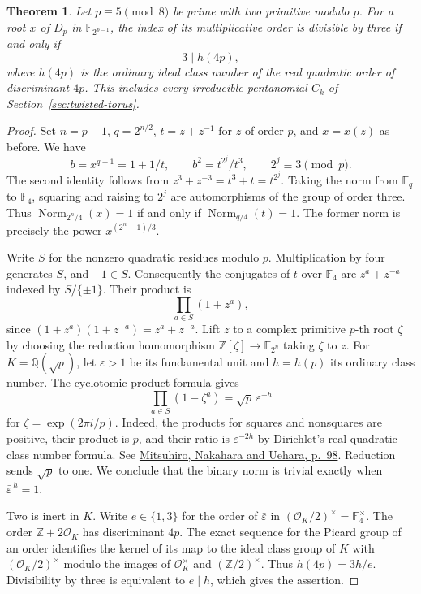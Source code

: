 \documentclass[11pt]{article}
\newtheorem{theorem}{Theorem}
\begin{document}
\begin{theorem}
Let \(p\equiv5\pmod8\) be prime with two primitive modulo \(p\).
For a root \(x\) of \(D_p\) in \(\mathbb F_{2^{p-1}}\), the index
of its multiplicative order is divisible by three if and only if
\[
                  3\mid h(4p),
\]
where \(h(4p)\) is the ordinary ideal class number of the real
quadratic order of discriminant \(4p\). This includes every
irreducible pentanomial \(C_k\) of Section~\ref{sec:twisted-torus}.
\end{theorem}
\begin{proof}
Set \(n=p-1\), \(q=2^{n/2}\), \(t=z+z^{-1}\) for \(z\) of order
\(p\), and \(x=x(z)\) as before. We have
\[
 b=x^{q+1}=1+1/t,\qquad
 b^2=t^{2^j}/t^3,\qquad 2^j\equiv3\pmod p.
\]
The second identity follows from
\(z^3+z^{-3}=t^3+t=t^{2^j}\). Taking the norm from
\(\mathbb F_q\) to \(\mathbb F_4\), squaring and raising to
\(2^j\) are automorphisms of the group of order three. Thus
\(\operatorname{Norm}_{2^n/4}(x)=1\) if and only if
\(\operatorname{Norm}_{q/4}(t)=1\). The former norm is precisely
the power \(x^{(2^n-1)/3}\).

Write \(S\) for the nonzero quadratic residues modulo \(p\).
Multiplication by four generates \(S\), and \(-1\in S\).
Consequently the conjugates of \(t\) over \(\mathbb F_4\) are
\(z^a+z^{-a}\) indexed by \(S/\{\pm1\}\). Their product is
\[
                     \prod_{a\in S}(1+z^a),
\]
since \((1+z^a)(1+z^{-a})=z^a+z^{-a}\).
Lift \(z\) to a complex primitive \(p\)-th root \(\zeta\) by choosing
the reduction homomorphism \(\mathbb Z[\zeta]\to\mathbb F_{2^n}\)
taking \(\zeta\) to \(z\).
For \(K=\mathbb Q(\sqrt p)\), let \(\varepsilon>1\) be its
fundamental unit and \(h=h(p)\) its ordinary class number.
The cyclotomic product formula gives
\[
 \prod_{a\in S}(1-\zeta^a)=\sqrt p\,\varepsilon^{-h}
\]
for \(\zeta=\exp(2\pi i/p)\). Indeed, the products for squares
and nonsquares are positive, their product is \(p\), and their ratio
is \(\varepsilon^{-2h}\) by Dirichlet's real quadratic class number
formula. See \href{https://doi.org/10.4153/CMB-1995-013-6}
{Mitsuhiro, Nakahara and Uehara, p.~98}.
Reduction sends \(\sqrt p\) to one. We conclude that the binary
norm is trivial exactly when \(\bar\varepsilon^{\,h}=1\).

Two is inert in \(K\). Write \(e\in\{1,3\}\) for the order of
\(\bar\varepsilon\) in \((\mathcal O_K/2)^\times=\mathbb F_4^\times\).
The order \(\mathbb Z+2\mathcal O_K\) has discriminant \(4p\).
The exact sequence for the Picard group of an order identifies the
kernel of its map to the ideal class group of \(K\) with
\((\mathcal O_K/2)^\times\) modulo the images of
\(\mathcal O_K^\times\) and \((\mathbb Z/2)^\times\).
Thus \(h(4p)=3h/e\). Divisibility by three is equivalent to
\(e\mid h\), which gives the assertion.
\end{proof}
\end{document}
